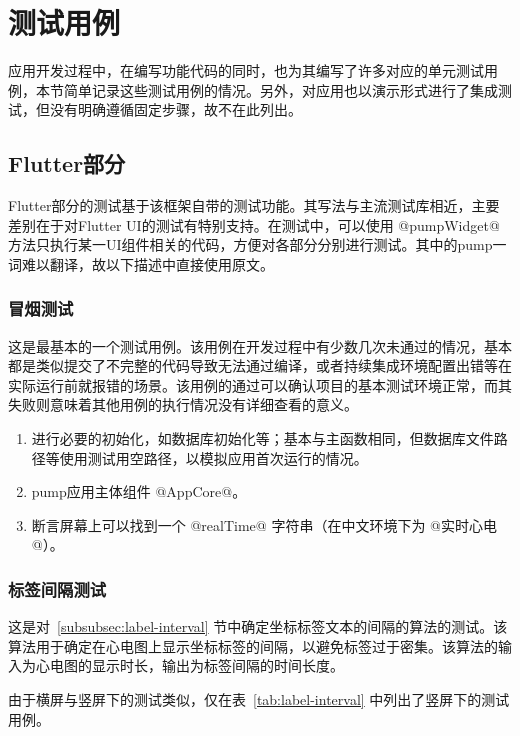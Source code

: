 \section{测试用例}\label{sec:test-case}

应用开发过程中，在编写功能代码的同时，也为其编写了许多对应的单元测试用例，本节简单记录这些测试用例的情况。另外，对应用也以演示形式进行了集成测试，但没有明确遵循固定步骤，故不在此列出。

\subsection{Flutter部分}\label{subsec:test-flutter}

Flutter部分的测试基于该框架自带的测试功能。其写法与主流测试库相近，主要差别在于对Flutter UI的测试有特别支持。在测试中，可以使用 @pumpWidget@ 方法只执行某一UI组件相关的代码，方便对各部分分别进行测试。其中的pump一词难以翻译，故以下描述中直接使用原文。

\subsubsection{冒烟测试}

这是最基本的一个测试用例。该用例在开发过程中有少数几次未通过的情况，基本都是类似提交了不完整的代码导致无法通过编译，或者持续集成环境配置出错等在实际运行前就报错的场景。该用例的通过可以确认项目的基本测试环境正常，而其失败则意味着其他用例的执行情况没有详细查看的意义。

\begin{enumerate}
    \item 进行必要的初始化，如数据库初始化等；基本与主函数相同，但数据库文件路径等使用测试用空路径，以模拟应用首次运行的情况。
    \item pump应用主体组件 @AppCore@。
    \item 断言屏幕上可以找到一个 @realTime@ 字符串（在中文环境下为 @实时心电@）。
\end{enumerate}

\subsubsection{标签间隔测试}

这是对~\ref{subsubsec:label-interval} 节中确定坐标标签文本的间隔的算法的测试。该算法用于确定在心电图上显示坐标标签的间隔，以避免标签过于密集。该算法的输入为心电图的显示时长，输出为标签间隔的时间长度。

由于横屏与竖屏下的测试类似，仅在表~\ref{tab:label-interval} 中列出了竖屏下的测试用例。

